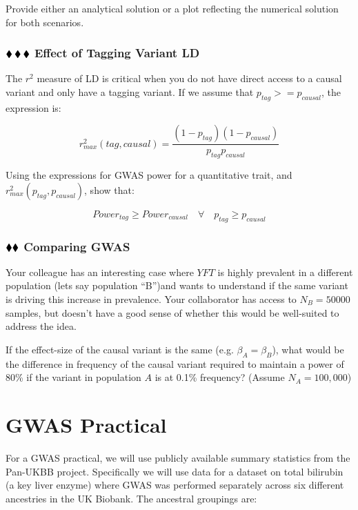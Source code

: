 \documentclass{pset}
\begin{document}
Provide either an analytical solution or a plot reflecting the numerical solution for both scenarios. 

\subsubsection*{$\mathbin{\blacklozenge}\mathbin{\blacklozenge}\mathbin{\blacklozenge}$  Effect of Tagging Variant LD}

The $r^2$ measure of LD is critical when you do not have direct access to a causal variant and only have a tagging variant. If we assume that $p_{tag} >= p_{causal}$, the expression is: 

$$r^2_{max}(tag, causal) = \frac{(1 - p_{tag})(1 - p_{causal})}{p_{tag}p_{causal}}$$

Using the expressions for GWAS power for a quantitative trait, and $r^2_{max}(p_{tag}, p_{causal})$, show that:

$$Power_{tag} \geq Power_{causal} \hspace{1em}\forall \hspace{1em} p_{tag} \geq p_{causal}$$

\subsubsection*{$\mathbin{\blacklozenge}\mathbin{\blacklozenge}$ Comparing GWAS}

Your colleague has an interesting case where $YFT$ is highly prevalent in a different population (lets say population ``B'')and wants to understand if the same variant is driving this increase in prevalence. Your collaborator has access to $N_B=50000$ samples, but doesn't have a good sense of whether this would be well-suited to address the idea.

If the effect-size of the causal variant is the same (e.g. $\beta_A = \beta_B$), what would be the difference in frequency of the causal variant required to maintain a power of 80\% if the variant in population $A$ is at 0.1\% frequency? (Assume $N_A = 100,000$)  


\section*{GWAS Practical}

For a GWAS practical, we will use publicly available summary statistics from the Pan-UKBB project. Specifically we will use data for a dataset on total bilirubin (a key liver enzyme) where GWAS was performed separately across six different ancestries in the UK Biobank. The ancestral groupings are: 
\end{document}
